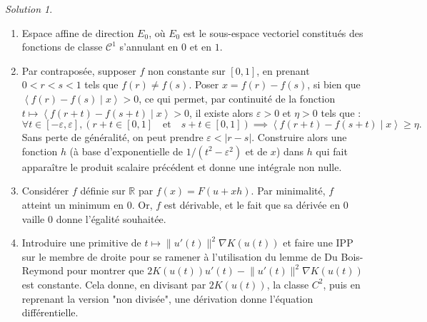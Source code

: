 \documentclass[french]{book}
\newcommand{\R}{\mathbb{R}}
\theoremstyle{definition}
\theoremstyle{remark}
\newtheorem*{sol}{Solution}
\begin{document}
\begin{sol}
	\begin{enumerate}
		\item Espace affine de direction $E_0$, où $E_0$ est le sous-espace vectoriel constitués des fonctions de classe $\mathcal{C}^1$ s'annulant en $0$ et en $1$.
		\item Par contraposée, supposer $f$ non constante sur $[0,1]$, en prenant $0<r<s<1$ tels que $f(r)\ne f(s)$. Poser $x=f(r)-f(s)$, si bien que $\left\langle f(r)-f(s)\mid x\right\rangle>0$, ce qui permet, par continuité de la fonction $t\mapsto \left\langle f(r+t)-f(s+t)\mid x\right\rangle>0$, il existe alors $\varepsilon >0$ et $\eta>0$ tels que :
		$$\forall t\in[-\varepsilon,\varepsilon], (r+t\in[0,1]\quad\text{et}\quad s+t\in[0,1])\implies \left\langle f(r+t)-f(s+t)\mid x\right\rangle\geqslant\eta.$$ Sans perte de généralité, on peut prendre $\varepsilon< \lvert r-s\rvert$. Construire alors une fonction $h$ (à base d'exponentielle de $1/(t^2-\varepsilon^2)$ et de $x$) dans $h$ qui fait apparaître le produit scalaire précédent et donne une intégrale non nulle.
		\item Considérer $f$ définie sur $\R$ par $f(x)=F(u+xh)$. Par minimalité, $f$ atteint un minimum en $0$. Or, $f$ est dérivable, et le fait que sa dérivée en $0$ vaille $0$ donne l'égalité souhaitée.
		\item Introduire une primitive de $t\mapsto\lVert u'(t)\rVert^2\nabla K(u(t))$ et faire une IPP sur le membre de droite pour se ramener à l'utilisation du lemme de Du Bois-Reymond pour montrer que $2K(u(t))u'(t)-\lVert u'(t)\rVert^2\nabla K(u(t))$ est constante. Cela donne, en divisant par $2K(u(t))$, la classe $C^2$, puis en reprenant la version "non divisée", une dérivation donne l'équation différentielle.
	\end{enumerate}
\end{sol}
\end{document}
